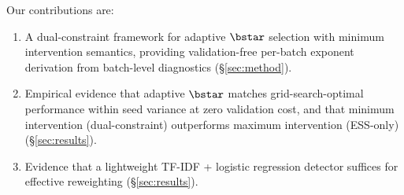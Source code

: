 Our contributions are:
\begin{enumerate}[nosep,leftmargin=*]
  \item A dual-constraint framework for adaptive $\bstar$ selection with minimum intervention semantics, providing validation-free per-batch exponent derivation from batch-level diagnostics (\S\ref{sec:method}).
  \item Empirical evidence that adaptive $\bstar$ matches grid-search-optimal performance within seed variance at zero validation cost, and that minimum intervention (dual-constraint) outperforms maximum intervention (ESS-only) (\S\ref{sec:results}).
  \item Evidence that a lightweight TF-IDF + logistic regression detector suffices for effective reweighting (\S\ref{sec:results}).
\end{enumerate}
